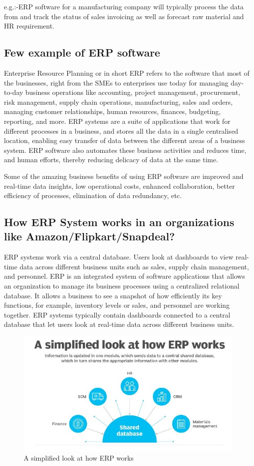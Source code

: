 \documentclass[12pt, a4paper]{article}
\begin{document}
e.g.:-ERP software for a manufacturing company will typically process the data from and track the status of sales invoicing as well as forecast raw material and HR requirement.
\subsection{Few example of ERP software}
Enterprise Resource Planning or in short ERP refers to the software that most of the businesses, right from the SMEs to enterprises use today for managing day-to-day business operations like accounting, project management, procurement, risk management, supply chain operations, manufacturing, sales and orders, managing customer relationships, human resources, finances, budgeting, reporting, and more. ERP systems are a suite of applications that work for different processes in a business, and stores all the data in a single centralised location, enabling easy transfer of data between the different areas of a business system. ERP software also automates these business activities and reduces time, and human efforts, thereby reducing delicacy of data at the same time.

Some of the amazing business benefits of using ERP software are improved and real-time data insights, low operational costs, enhanced collaboration, better efficiency of processes, elimination of data redundancy, etc.

\subsection{How ERP System works in an organizations like Amazon/Flipkart/Snapdeal?}

ERP systems work via a central database. Users look at dashboards to view real-time data across different business units such as sales, supply chain management, and personnel.
ERP is an integrated system of software applications that allows an organization to manage its business processes using a centralized relational database. It allows a business to see a snapshot of how efficiently its key functions, for example, inventory levels or sales, and personnel are working together.
ERP systems typically contain dashboards connected to a central database that let users look at real-time data across different business units.

\begin{figure}[ht]
  \centering
  \includegraphics[width=\columnwidth]{howerpworks}
  \caption{A simplified look at how ERP works}
\end{figure}
\end{document}
